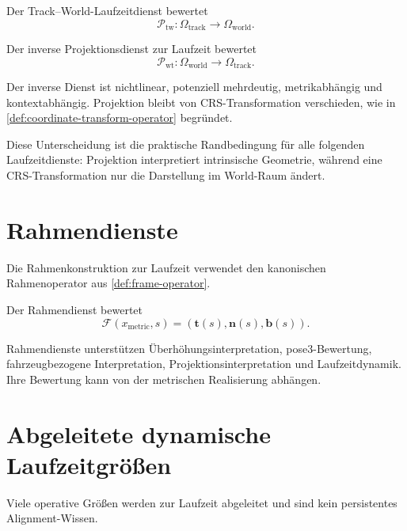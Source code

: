 \begin{definition}
\label{def:track-to-world-runtime}
Der Track--World-Laufzeitdienst bewertet
\[
\mathcal P_{\mathrm{tw}}
:
\Omega_{\mathrm{track}}
\rightarrow
\Omega_{\mathrm{world}}.
\]
\end{definition}

\begin{definition}
\label{def:world-to-track-runtime}
Der inverse Projektionsdienst zur Laufzeit bewertet
\[
\mathcal P_{\mathrm{wt}}
:
\Omega_{\mathrm{world}}
\rightarrow
\Omega_{\mathrm{track}}.
\]
\end{definition}

Der inverse Dienst ist nichtlinear, potenziell mehrdeutig, metrikabhängig und
kontextabhängig. Projektion bleibt von CRS-Transformation verschieden, wie in
\cref{def:coordinate-transform-operator} begründet.

Diese Unterscheidung ist die praktische Randbedingung für alle folgenden
Laufzeitdienste: Projektion interpretiert intrinsische Geometrie, während eine
CRS-Transformation nur die Darstellung im World-Raum ändert.

\section{Rahmendienste}

Die Rahmenkonstruktion zur Laufzeit verwendet den kanonischen Rahmenoperator
aus \cref{def:frame-operator}.

\begin{definition}[Rahmendienst]
\label{def:frame-service}
Der Rahmendienst bewertet
\[
\mathcal F(x_{\mathrm{metric}},s)
=
(\mathbf t(s),\mathbf n(s),\mathbf b(s)).
\]
\end{definition}

Rahmendienste unterstützen Überhöhungsinterpretation, pose3-Bewertung,
fahrzeugbezogene Interpretation, Projektionsinterpretation und
Laufzeitdynamik. Ihre Bewertung kann von der metrischen Realisierung abhängen.

\section{Abgeleitete dynamische Laufzeitgrößen}

Viele operative Größen werden zur Laufzeit abgeleitet und sind kein
persistentes Alignment-Wissen.

